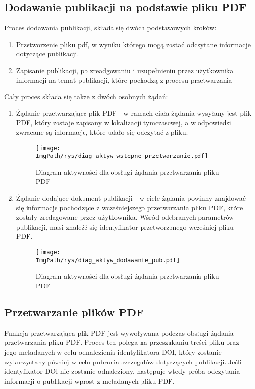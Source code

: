 \documentclass[a4paper,12pt,twoside,openany]{report}
\newcommand{\ImgPath}{.}
\begin{document}
\subsection{Dodawanie publikacji na podstawie pliku PDF}
Proces dodawania publikacji, składa się dwóch podstawowych kroków:
\begin{enumerate}
	\item Przetworzenie pliku pdf, w wyniku którego mogą zostać odczytane informacje dotyczące publikacji.
	\item Zapisanie publikacji, po zreadgowaniu i uzupełnieniu przez użytkownika informacji na temat publikacji, które pochodzą z procesu przetwarzania
\end{enumerate}
Cały proces składa się także z dwóch osobnych żądań: 
\begin{enumerate}	
	\item Żądanie przetwarzające plik PDF - w ramach ciała żądania wysyłany jest plik PDF, który zostaje zapisany w lokalizacji tymczasowej, a w odpowiedzi zwracane są informacje, które udało się odczytać z pliku. 
	\begin{figure}[!htbp]
		\begin{center}
			\centering
			\texttt{[image: \\ImgPath/rys/diag\_aktyw\_wstepne\_przetwarzanie.pdf]}
		\end{center}
		\caption{Diagram aktywności dla obsługi żądania przetwarzania pliku PDF}
		\label{diagramAktywnosciDodawanie}
	\end{figure}
	
	\item Żądanie dodające dokument publikacji - w ciele żądania powinny znajdować się informacje pochodzące z wcześniejszego przetwarzania pliku PDF, które zostały zredagowane przez użytkownika. Wśród odebranych parametrów publikacji, musi znaleźć się identyfikator przetworzonego wcześniej pliku PDF.
	\begin{figure}[!htbp]
		\begin{center}
			\centering
			\texttt{[image: \\ImgPath/rys/diag\_aktyw\_dodawanie\_pub.pdf]}
		\end{center}
		\caption{Diagram aktywności dla obsługi żądania przetwarzania pliku PDF}
		\label{diagramAktywnosciDodawanie}
	\end{figure}
	
\end{enumerate}

\subsection{Przetwarzanie plików PDF}
Funkcja przetwarzająca plik PDF jest wywoływana podczas obsługi żądania przetwarzania pliku PDF. Proces ten polega na przeszukaniu treści pliku oraz jego metadanych w celu odnalezienia identyfikatora DOI, który zostanie wykorzystany później w celu pobrania szczegółów dotyczących publikacji. Jeśli identyfikator DOI nie zostanie odnaleziony, następuje wtedy próba odczytania informacji o publikacji wprost z metadanych pliku PDF.
\end{document}
